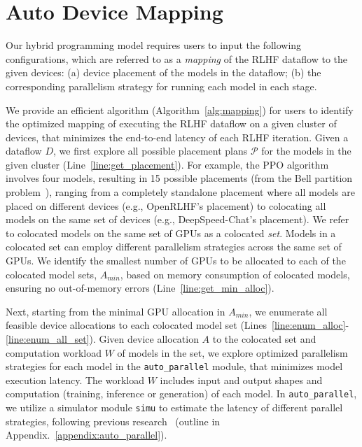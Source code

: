 \vspace{-3mm}
\section{Auto Device Mapping} \label{sec:auto_mapping}

Our hybrid programming model %
requires users to input the following configurations, which are referred to as a \textit{mapping} of the RLHF dataflow to the given devices: %
(a) device placement of the models in the dataflow; (b) the corresponding parallelism strategy for running each model in each stage. %



We provide an efficient %
algorithm (Algorithm~\ref{alg:mapping})  
for users to identify the optimized mapping of executing the RLHF dataflow on a given cluster of devices, that minimizes the end-to-end latency of each RLHF iteration. Given a dataflow $D$, we first explore all possible placement plans $\mathcal{P}$ %
for the models in the given cluster (Line~\ref{line:get_placement}).
For example, the PPO algorithm involves four models, resulting in 15 possible placements (from the Bell partition problem~\cite{bell1934exponential, rota1964number}),
ranging from a completely standalone placement where all models are placed on different devices (e.g., OpenRLHF's placement) to colocating all models on the same set of devices (e.g., DeepSpeed-Chat's placement). We refer to %
colocated models on the same set of GPUs as a colocated \textit{set}. Models in a colocated set can employ different parallelism strategies across the same set of GPUs. We identify the smallest number of GPUs to be allocated to each of the colocated model sets, $A_{min}$, based on memory consumption of colocated models, ensuring no out-of-memory errors (Line~\ref{line:get_min_alloc}).

Next, starting from the minimal GPU allocation in $A_{min}$, we enumerate all feasible device allocations to each colocated model set (Lines~\ref{line:enum_alloc}-\ref{line:enum_all_set}).
Given device allocation $A$ to the colocated set and computation workload $W$ of models in the set, we explore optimized parallelism strategies for each model in the \verb|auto_parallel| module, that minimizes model execution latency. 
The workload $W$ includes input and output shapes and computation (training, inference or generation) of each model. 
In \verb|auto_parallel|,  we utilize a simulator module \verb|simu| to estimate the latency of different parallel strategies, following previous research~\cite{zhongDistServeDisaggregatingPrefill2024, zheng2022alpa, yuan2024llmrooftline, llm-analysis} (outline in 
Appendix.~\ref{appendix:auto_parallel}).










